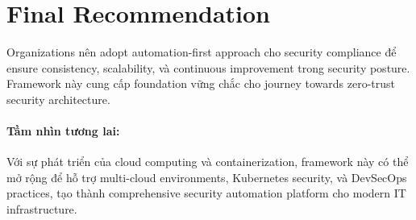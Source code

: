 \section*{Final Recommendation}
Organizations nên adopt automation-first approach cho security compliance để ensure consistency, scalability, và continuous improvement trong security posture. Framework này cung cấp foundation vững chắc cho journey towards zero-trust security architecture.

\paragraph{Tầm nhìn tương lai:}
Với sự phát triển của cloud computing và containerization, framework này có thể mở rộng để hỗ trợ multi-cloud environments, Kubernetes security, và DevSecOps practices, tạo thành comprehensive security automation platform cho modern IT infrastructure.
